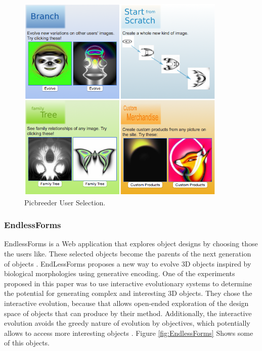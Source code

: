\begin{figure}
\captionsetup{justification=centering,margin=2cm}
\centering
\setlength\fboxsep{0pt}
\setlength\fboxrule{0.7pt}
\includegraphics[width=10cm,height=10cm,keepaspectratio]{img/Picbreeder.png}
\caption{Picbreeder User Selection.}
\label{fig:Picbreeder}
\end{figure}

\subsubsection{EndlessForms}
EndlessForms is a Web application that explores object designs by choosing those
the users like. These selected objects become the parents of the next generation
of objects \cite{clune2011evolving}. EndLessForms proposes a new way to evolve
3D objects inspired by biological morphologies using generative encoding. One of
the experiments proposed in this paper was to use interactive evolutionary
systems to determine the potential for generating complex and interesting 3D
objects. They chose the interactive evolution, because that allows open-ended
exploration of the design space of objects that can produce by their method.
Additionally, the interactive evolution avoids the greedy nature of evolution by
objectives, which potentially allows to access more interesting objects
\cite{clune2011evolving}. Figure \ref{fig:EndlessForms} Shows some of
this objects.

